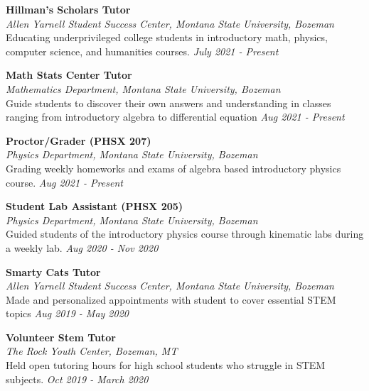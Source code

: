 \documentclass[12pt]{article}
\begin{document}
\noindent
\textbf{Hillman's Scholars Tutor}\\
\textit{Allen Yarnell Student Success Center, Montana State University, Bozeman}\\
Educating underprivileged college students in introductory math, physics, computer science, and humanities courses. \hfill
\textit{July 2021 - Present}

\noindent
\textbf{Math Stats Center Tutor}\\
\textit{Mathematics Department, Montana State University, Bozeman}\\
Guide students to discover their own answers and understanding in classes ranging from introductory algebra to differential equation \hfill
\textit{Aug 2021 - Present}

\noindent
\textbf{Proctor/Grader (PHSX 207)}\\
\textit{Physics Department, Montana State University, Bozeman}\\
Grading weekly homeworks and exams of algebra based introductory physics course. 	  \hfill
\textit{Aug 2021 - Present}

\noindent
\textbf{Student Lab Assistant (PHSX 205)}\\
\textit{Physics Department, Montana State University, Bozeman}\\
Guided students of the introductory physics course through kinematic labs during a weekly lab.	  \hfill
\textit{Aug 2020 - Nov 2020}

\noindent
\textbf{Smarty Cats Tutor}\\
\textit{Allen Yarnell Student Success Center, Montana State University, Bozeman}\\
Made and personalized appointments with student to cover essential STEM topics	  \hfill
\textit{Aug 2019 - May 2020}

\noindent
\textbf{Volunteer Stem Tutor}\\
\textit{The Rock Youth Center, Bozeman, MT}\\
Held open tutoring hours for high school students who struggle in STEM subjects.	  \hfill
\textit{Oct 2019 - March 2020}
\end{document}

